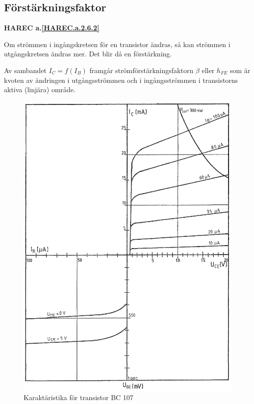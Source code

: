 \subsection{Förstärkningsfaktor}
\textbf{HAREC a.\ref{HAREC.a.2.6.2}\label{myHAREC.a.2.6.2}}

Om strömmen i ingångskretsen för en transistor ändras, så kan strömmen i
utgångskretsen ändras mer. Det blir då en förstärkning.

Av sambandet \(I_C = f(I_B)\) framgår strömförstärkningsfaktorn \(\beta\) eller
\(h_{FE}\) som är kvoten av ändringen i utgångsströmmen och i ingångsströmmen i
transistorns aktiva (linjära) område.

\begin{figure}
\includegraphics[width=\textwidth]{images/cropped_pdfs/bild_2_2-19.pdf}
\caption{Karaktäristika för transistor BC 107}
\label{fig:BildII2-19}
\end{figure}

